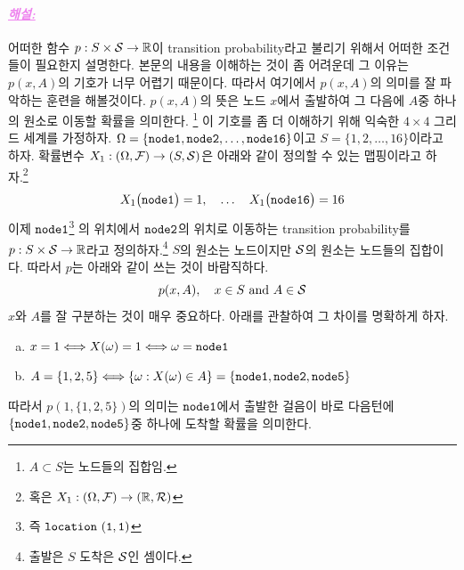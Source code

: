 \documentclass[12pt,oneside,english,a4paper]{article}
\newcommand{\paraviolet}[1]{\paragraph{\LARGE\textcolor{violet}{\it\underline{\textbf{#1:}}}}\LARGE}
\begin{document}
\paraviolet{해설} 어떠한 함수 $p:S\times {\cal S} \to \mathbb{R}$이 transition probability라고 불리기 위해서 어떠한 조건들이 필요한지 설명한다. 본문의 내용을 이해하는 것이 좀 어려운데 그 이유는 $p(x,A)$의 기호가 너무 어렵기 때문이다. 따라서 여기에서 $p(x,A)$의 의미를 잘 파악하는 훈련을 해볼것이다. $p(x,A)$의 뜻은 노드 $x$에서 출발하여 그 다음에 $A$중 하나의 원소로 이동할 확률을 의미한다. \footnote{$A\subset S$는 노드들의 집합임.} 이 기호를 좀 더 이해하기 위해 익숙한 $4\times 4$ 그리드 세계를 가정하자. $\Omega={\tt \{node 1,node 2,\dots,node 16\}}$이고 $S=\{1,2,\dots,16\}$이라고 하자. 확률변수 $X_1:(\Omega,{\cal F}) \to (S, {\cal S})$은 아래와 같이 정의할 수 있는 맵핑이라고 하자.\footnote{혹은 $X_1:(\Omega,{\cal F}) \to (\mathbb{R},{\cal R})$}
\begin{align*}
X_1\big({\tt node 1}\big)=1, \quad \dots \quad X_1\big({\tt node 16}\big)=16
\end{align*}
이제 ${\tt node1}$\footnote{ 즉 ${\tt location~ (1,1)}$} 의 위치에서 ${\tt node2}$의 위치로 이동하는 transition probability를 $p:S\times {\cal S} \to \mathbb{R}$라고 정의하자.\footnote{출발은 $S$ 도착은 ${\cal S}$인 셈이다.}  $S$의 원소는 노드이지만 ${\cal S}$의 원소는 노드들의 집합이다. 따라서 $p$는 아래와 같이 쓰는 것이 바람직하다. 
\[
p(x,A), \quad x \in S \mbox{ and } A \in {\cal S}
\]
$x$와 $A$를 잘 구분하는 것이 매우 중요하다. 아래를 관찰하여 그 차이를 명확하게 하자. 
\begin{enumerate}[(a)]
\item $x=1  \Longleftrightarrow  X(\omega)=1  \Longleftrightarrow  \omega={\tt node1}$
\item $A=\{1,2,5\}  \Longleftrightarrow  \{\omega:X(\omega) \in A\}=\{{\tt node1,node2,node5}\}$
\end{enumerate}
따라서 $p(1,\{1,2,5\})$의 의미는 ${\tt node1}$에서 출발한 걸음이 바로 다음턴에 ${\tt \{node1, node2, node5\}}$중 하나에 도착할 확률을 의미한다. 
\end{document}
